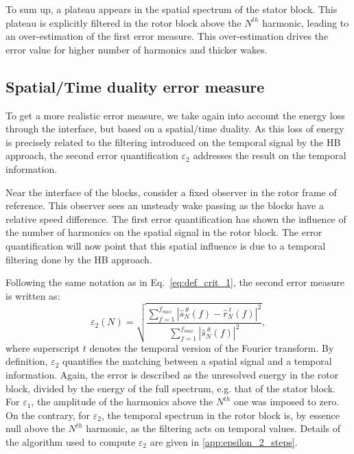 To sum up, a plateau appears in the spatial spectrum of the
stator block. This plateau is explicitly filtered in the
rotor block above the $N^{th}$ harmonic, leading to an over-estimation of the 
first error measure. This over-estimation drives the error value
for higher number of harmonics and thicker wakes.

\FloatBarrier

\subsection{Spatial/Time duality error measure}
To get a more realistic error measure, we take 
again into account the energy loss
through the interface, but based on a spatial/time duality. 
As this loss of energy is 
precisely related to the filtering 
introduced on the temporal signal by the HB approach, the second 
error quantification $\varepsilon_2$ addresses the result on 
the temporal information. 

Near the interface of the blocks, consider a fixed observer in
the rotor frame of reference. This observer sees an unsteady 
wake passing as the blocks have a relative speed difference.
The first error quantification has shown the 
influence of the number of harmonics on the spatial signal 
in the rotor block. The error quantification will now
point that this spatial influence is due to a temporal filtering done by
the HB approach.

Following the same notation as in Eq.~\eqref{eq:def_crit_1}, 
the second error measure is written as:
\begin{equation}
    \varepsilon_2(N) = \sqrt{
    \frac{\sum_{f=1}^{f_{max}} | \widehat{s}^{~\theta}_N (f) - 
      \widehat{r}^{~t}_N (f)|^2}{ 
    \sum_{f=1}^{f_{max}} | \widehat{s}^{~\theta}_N (f)|^2}},
    \label{eq:def_crit_2}
\end{equation}
where superscript $t$ denotes the temporal version of
the Fourier transform.
By definition, $\varepsilon_2$
quantifies the matching between a spatial signal
and a temporal information.
Again, the error is described as the unresolved energy 
in the rotor block, 
divided by the energy of the full spectrum, 
e.g. that of the stator block. 
For $\varepsilon_1$, the amplitude 
of the harmonics above the $N^{th}$ one was imposed to zero. 
On the contrary, for $\varepsilon_2$, the temporal spectrum 
in the rotor block is, 
by essence null above the $N^{th}$ harmonic, as the filtering 
acts on temporal values. 
Details of the algorithm used to compute $\varepsilon_2$ are given in \ref{app:epsilon_2_steps}.


